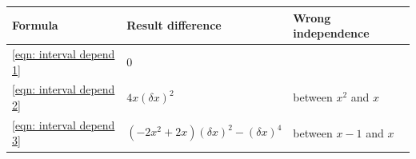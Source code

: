 \documentclass[twoside]{article}
\numberwithin{equation}{section}
\newcommand{\eqspace}{\;\;\;}
\begin{document}

\begin{table}
\centering
\begin{tabular}{|l|l|l|} 
\hline 
Formula & Result difference & Wrong independence \\ 
\hline 
\eqref{eqn: interval depend 1} & $0$ & \\
\hline 
\eqref{eqn: interval depend 2} & $4 x (\delta x)^2$ & between $x^2$ and $x$ \\
\hline 
\eqref{eqn: interval depend 3} & $( - 2 x^2 + 2 x) (\delta x)^2 - (\delta x)^4$ & between $x-1$ and $x$ \\
\hline 
\end{tabular}
\label{tbl: dependency example}
\end{table}
\end{document}
